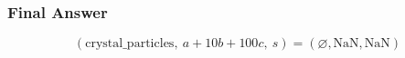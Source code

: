 \subsubsection*{Final Answer}

\[
\boxed{
\left(
\mathrm{crystal\_particles},\ a+10b+100c,\ s
\right)
=\left(\varnothing,\mathrm{NaN},\mathrm{NaN}\right)
}
\]
